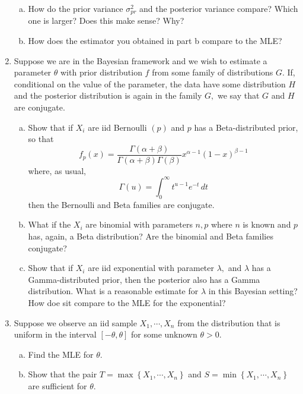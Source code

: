 \documentclass{article}
\begin{document}
\begin{enumerate}
\begin{enumerate}[(a)]
			\item How do the prior variance $\sigma_{pr}^2$ and the posterior variance compare? Which one is larger? Does this make sense? Why?

			\item How does the estimator you obtained in part b compare to the MLE?
				
		\end{enumerate}

	\item Suppose we are in the Bayesian framework and we wish to estimate a parameter $\theta$ with prior distribution $f$ from some family of distributions $G.$ If, conditional on the value of the parameter, the data have some distribution $H$ and the posterior distribution is again in the family $G,$ we say that $G$ and $H$ are conjugate.

		\begin{enumerate}[(a)]
			\item Show that if $X_i$ are iid Bernoulli $(p)$ and $p$ has a Beta-distributed prior, so that \[f_p(x)=\frac{\Gamma(\alpha+\beta)}{\Gamma(\alpha+\beta)\Gamma(\beta)}x^{\alpha-1}(1-x)^{\beta-1}\] where, as usual, \[\Gamma(u)=\int_0^\infty t^{u-1}e^{-t}\, dt\] then the Bernoulli and Beta families are conjugate.

			\item What if the $X_i$ are binomial with parameters $n, p$ where $n$ is known and $p$ has, again, a Beta distribution? Are the binomial and Beta families conjugate?

			\item Show that if $X_i$ are iid exponential with parameter $\lambda,$ and $\lambda$ has a Gamma-distributed prior, then the posterior also has a Gamma distribution. What is a reasonable estimate for $\lambda$ in this Bayesian setting? How doe sit compare to the MLE for the exponential?
				
		\end{enumerate}

	\item Suppose we observe an iid sample $X_1, \cdots, X_n$ from the distribution that is uniform in the interval $[-\theta, \theta]$ for some unknown $\theta>0.$

		\begin{enumerate}[(a)]
			\item Find the MLE for $\theta.$

			\item Show that the pair $T=\max\left\{ X_1, \cdots, X_n \right\}$ and $S=\min\left\{ X_1, \cdots, X_n \right\}$ are sufficient for $\theta.$
				

\end{enumerate}
\end{enumerate}
\end{document}
